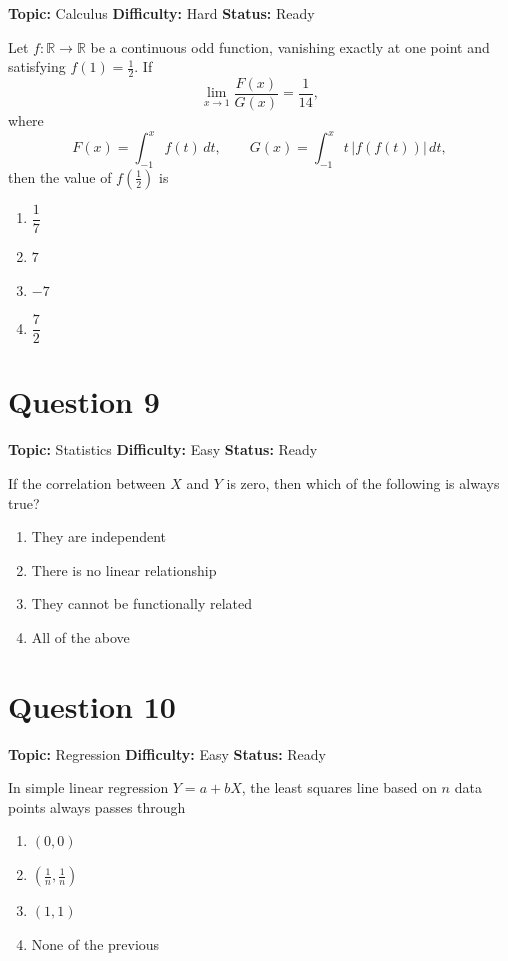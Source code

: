 \documentclass[11pt]{article}
\begin{document}
\noindent\textbf{Topic:} Calculus \quad \textbf{Difficulty:} Hard \quad \textbf{Status:} Ready



Let $f:\mathbb{R}\to\mathbb{R}$ be a continuous odd function, vanishing exactly at one point and satisfying $f(1) = \tfrac{1}{2}$. If
\[
\lim_{x\to 1} \frac{F(x)}{G(x)} = \frac{1}{14},
\]
where
\[
F(x) = \int_{-1}^{x} f(t)\,dt, \qquad G(x) = \int_{-1}^{x} t\,|f(f(t))|\,dt,
\]
then the value of $f\!\left(\tfrac{1}{2}\right)$ is
\begin{enumerate}[label=(\Alph*)]
\item $\dfrac{1}{7}$ \item $7$ \item $-7$ \item $\dfrac{7}{2}$
\end{enumerate}

\newpage

\section*{Question 9}


\noindent\textbf{Topic:} Statistics \quad \textbf{Difficulty:} Easy \quad \textbf{Status:} Ready



If the correlation between $X$ and $Y$ is zero, then which of the following is always true?
\begin{enumerate}[label=(\Alph*)]
\item They are independent
\item There is no linear relationship
\item They cannot be functionally related
\item All of the above
\end{enumerate}

\newpage

\section*{Question 10}


\noindent\textbf{Topic:} Regression \quad \textbf{Difficulty:} Easy \quad \textbf{Status:} Ready



In simple linear regression $Y = a + bX$, the least squares line based on $n$ data points always passes through
\begin{enumerate}[label=(\Alph*)]
\item $(0,0)$
\item $\left(\tfrac{1}{n}, \tfrac{1}{n}\right)$
\item $(1,1)$
\item None of the previous
\end{enumerate}
\end{document}
